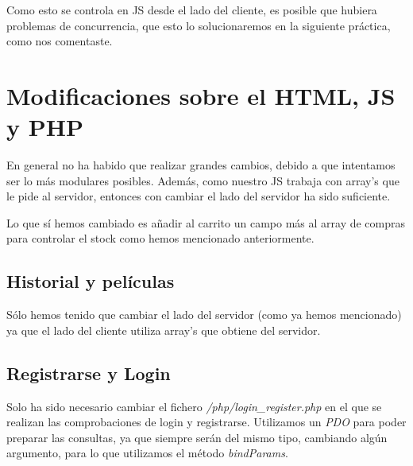 \documentclass[nochap]{apuntes}
\begin{document}
Como esto se controla en JS desde el lado del cliente, es posible que hubiera problemas de concurrencia, que esto lo solucionaremos en la siguiente práctica, como nos comentaste.


\section{Modificaciones sobre el HTML, JS y PHP}
En general no ha habido que realizar grandes cambios, debido a que intentamos ser lo más modulares posibles. Además, como nuestro JS trabaja con array's que le pide al servidor, entonces con cambiar el lado del servidor ha sido suficiente.

Lo que sí hemos cambiado es añadir al carrito un campo más al array de compras para controlar el stock como hemos mencionado anteriormente.

\subsection{Historial y películas}
Sólo hemos tenido que cambiar el lado del servidor (como ya hemos mencionado) ya que el lado del cliente utiliza array's que obtiene del servidor.


\subsection{Registrarse y Login}

Solo ha sido necesario cambiar el fichero \textit{/php/login\_register.php} en el que se realizan las comprobaciones de login y registrarse. Utilizamos un \textit{PDO} para poder preparar las consultas, ya que siempre serán del mismo tipo, cambiando algún argumento, para lo que utilizamos el método \textit{bindParams}.
\end{document}
